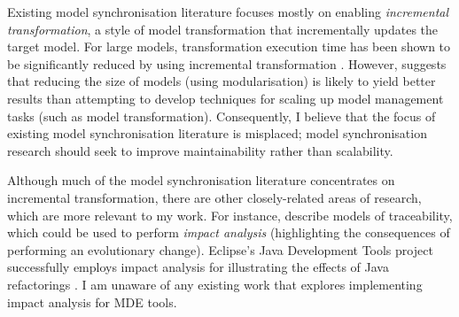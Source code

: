 Existing model synchronisation literature focuses mostly on enabling \textit{incremental transformation}, a style of model transformation that incrementally updates the target model. For large models, transformation execution time has been shown to be significantly reduced by using incremental transformation \cite{hearnden06incremental}. However, \cite{kolovos08scalability} suggests that reducing the size of models (using modularisation) is likely to yield better results than attempting to develop techniques for scaling up model management tasks (such as model transformation). Consequently, I believe that the focus of existing model synchronisation literature is misplaced; model synchronisation research should seek to improve maintainability rather than scalability.  %

Although much of the model synchronisation literature concentrates on incremental transformation, there are other closely-related areas of research, which are more relevant to my work. For instance, \cite{jouault05loosely,drivalos08loosely} describe models of traceability, which could be used to perform \textit{impact analysis} (highlighting the consequences of performing an evolutionary change). Eclipse's Java Development Tools project successfully employs impact analysis for illustrating the effects of Java refactorings \cite{fuhrer07refactoring}. I am unaware of any existing work that explores implementing impact analysis for MDE tools.